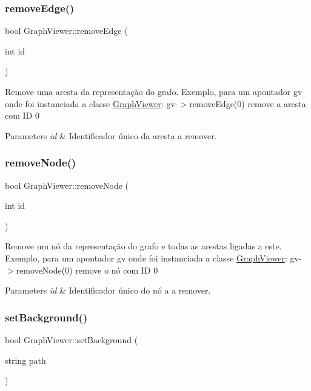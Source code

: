 \subsubsection{\texorpdfstring{remove\+Edge()}{removeEdge()}}
{\footnotesize\ttfamily bool Graph\+Viewer\+::remove\+Edge (\begin{DoxyParamCaption}\item[{int}]{id }\end{DoxyParamCaption})}

Remove uma aresta da representação do grafo. Exemplo, para um apontador gv onde foi instanciada a classe \mbox{\hyperlink{class_graph_viewer}{Graph\+Viewer}}\+: gv-\/$>$remove\+Edge(0) remove a aresta com ID 0


\begin{DoxyParams}{Parameters}
{\em id} & Identificador único da aresta a remover. \\
\hline
\end{DoxyParams}
\mbox{\label{class_graph_viewer_a0c418639bb911eb827cabf895915f775}} 
\subsubsection{\texorpdfstring{remove\+Node()}{removeNode()}}
{\footnotesize\ttfamily bool Graph\+Viewer\+::remove\+Node (\begin{DoxyParamCaption}\item[{int}]{id }\end{DoxyParamCaption})}

Remove um nó da representação do grafo e todas as arestas ligadas a este. Exemplo, para um apontador gv onde foi instanciada a classe \mbox{\hyperlink{class_graph_viewer}{Graph\+Viewer}}\+: gv-\/$>$remove\+Node(0) remove o nó com ID 0


\begin{DoxyParams}{Parameters}
{\em id} & Identificador único do nó a a remover. \\
\hline
\end{DoxyParams}
\mbox{\label{class_graph_viewer_a02437b5fecd8b90de24436068312d593}} 
\subsubsection{\texorpdfstring{set\+Background()}{setBackground()}}
{\footnotesize\ttfamily bool Graph\+Viewer\+::set\+Background (\begin{DoxyParamCaption}\item[{string}]{path }\end{DoxyParamCaption})}

